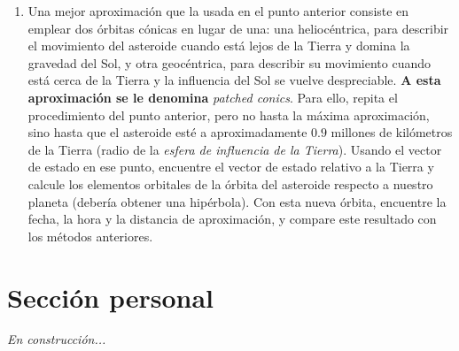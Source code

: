 \documentclass[a4paper]{article}
\begin{document}
\begin{enumerate}[leftmargin=*]
    \item Una mejor aproximación que la usada en el punto anterior consiste en emplear dos órbitas cónicas en lugar de una: una heliocéntrica, para describir el movimiento del asteroide cuando está lejos de la Tierra y domina la gravedad del Sol, y otra geocéntrica, para describir su movimiento cuando está cerca de la Tierra y la influencia del Sol se vuelve despreciable. \textbf{A esta aproximación se le denomina} \textit{patched conics}. Para ello, repita el procedimiento del punto anterior, pero no hasta la máxima aproximación, sino hasta que el asteroide esté a aproximadamente $0.9$ millones de kilómetros de la Tierra (radio de la \textit{esfera de influencia de la Tierra}). Usando el vector de estado en ese punto, encuentre el vector de estado relativo a la Tierra y calcule los elementos orbitales de la órbita del asteroide respecto a nuestro planeta (debería obtener una hipérbola). Con esta nueva órbita, encuentre la fecha, la hora y la distancia de aproximación, y compare este resultado con los métodos anteriores.
\end{enumerate}

\section{Sección personal}












\begin{center}
\begin{tcolorbox}[width=0.55\textwidth,colback=white,colframe=black!50,boxrule=0.4pt,arc=2pt]
\centering\textit{En construcción...}
\end{tcolorbox}
\end{center}
\end{document}

